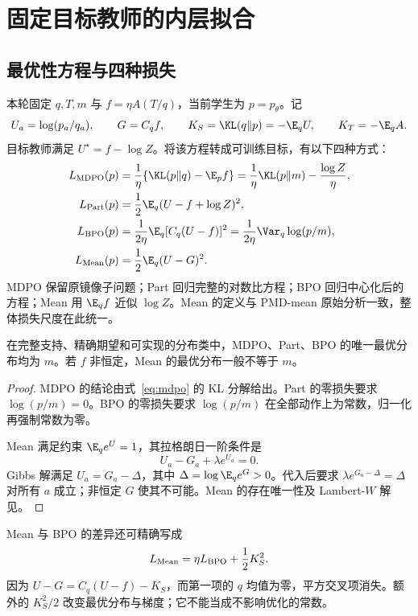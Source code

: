 \chapter{固定目标教师的内层拟合}
\label{ch:inner}
\section{最优性方程与四种损失}
本轮固定 $q,T,m$ 与 $f=\eta A(T/q)$，当前学生为 $p=p_\theta$。记
\begin{equation}
U_a=\log(p_a/q_a),\qquad G=C_qf,\qquad
K_S=\KL(q\Vert p)=-\E_qU,\qquad K_T=-\E_qA.
\end{equation}
目标教师满足 $U^\star=f-\log Z$。将该方程转成可训练目标，有以下四种方式：
\begin{align}
L_{\rm MDPO}(p)&=\frac1\eta\{\KL(p\Vert q)-\E_pf\}
=\frac1\eta\KL(p\Vert m)-\frac{\log Z}{\eta},\label{eq:mdpo}\\
L_{\rm Part}(p)&=\frac12\E_q(U-f+\log Z)^2,\label{eq:part}\\
L_{\rm BPO}(p)&=\frac1{2\eta}\E_q[C_q(U-f)]^2
=\frac1{2\eta}\Var_q\log(p/m),\label{eq:bpo}\\
L_{\rm Mean}(p)&=\frac12\E_q(U-G)^2.\label{eq:mean}
\end{align}
MDPO 保留原镜像子问题；Part 回归完整的对数比方程；BPO 回归中心化后的方程；Mean 用 $\E_qf$ 近似 $\log Z$。Mean 的定义与 PMD-mean 原始分析一致，整体损失尺度在此统一。

\begin{proposition}
\label{prop:inner-roots}
在完整支持、精确期望和可实现的分布类中，MDPO、Part、BPO 的唯一最优分布均为 $m$。若 $f$ 非恒定，Mean 的最优分布一般不等于 $m$。
\end{proposition}
\begin{proof}
MDPO 的结论由式~\eqref{eq:mdpo} 的 KL 分解给出。Part 的零损失要求 $\log(p/m)=0$。BPO 的零损失要求 $\log(p/m)$ 在全部动作上为常数，归一化再强制常数为零。

Mean 满足约束 $\E_qe^U=1$，其拉格朗日一阶条件是
\begin{equation}
U_a-G_a+\lambda e^{U_a}=0.
\label{eq:mean-kkt-main}
\end{equation}
Gibbs 解满足 $U_a=G_a-\Delta$，其中 $\Delta=\log\E_qe^G>0$。代入后要求 $\lambda e^{G_a-\Delta}=\Delta$ 对所有 $a$ 成立；非恒定 $G$ 使其不可能。Mean 的存在唯一性及 Lambert-$W$ 解见。
\end{proof}

Mean 与 BPO 的差异还可精确写成
\begin{equation}
L_{\rm Mean}=\eta L_{\rm BPO}+\frac12K_S^2.
\label{eq:mean-bpo}
\end{equation}
因为 $U-G=C_q(U-f)-K_S$，而第一项的 $q$ 均值为零，平方交叉项消失。额外的 $K_S^2/2$ 改变最优分布与梯度；它不能当成不影响优化的常数。

